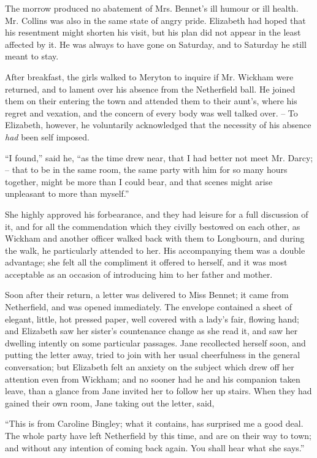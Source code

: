 The morrow produced no abatement of Mrs. Bennet’s
ill humour or ill health. Mr. Collins was also in the
same state of angry pride. Elizabeth had hoped that his
resentment might shorten his visit, but his plan did not
appear in the least affected by it. He was always to have
gone on Saturday, and to Saturday he still meant to stay.

After breakfast, the girls walked to Meryton to inquire
if Mr. Wickham were returned, and to lament over his
absence from the Netherfield ball. He joined them on
their entering the town and attended them to their aunt’s,
where his regret and vexation, and the concern of every
body was well talked over. -- To Elizabeth, however, he
voluntarily acknowledged that the necessity of his absence
\textit{had} been self imposed.

“I found,” said he, “as the time drew near, that I had
better not meet Mr. Darcy; -- that to be in the same
room, the same party with him for so many hours together,
might be more than I could bear, and that scenes might
arise unpleasant to more than myself.”

She highly approved his forbearance, and they had
leis\-ure for a full discussion of it, and for all the
commendation which they civilly bestowed on each other,
as Wickham and another officer walked back with them
to Longbourn, and during the walk, he particularly
attended to her. His accompanying them was a double
advantage; she felt all the compliment it offered to
herself, and it was most acceptable as an occasion of
introducing him to her father and mother.

Soon after their return, a letter was delivered to Miss
Bennet; it came from Netherfield, and was opened
immediately. The envelope contained a sheet of elegant,
little, hot pressed paper, well covered with a lady’s fair,
flowing hand; and Elizabeth saw her sister’s countenance
change as she read it, and saw her dwelling intently on
some particular passages. Jane recollected herself soon,
and putting the letter away, tried to join with her usual
cheerfulness in the general conversation; but Elizabeth
felt an anxiety on the subject which drew off her attention
even from Wickham; and no sooner had he and his
companion taken leave, than a glance from Jane invited
her to follow her up stairs. When they had gained their
own room, Jane taking out the letter, said,

“This is from Caroline Bingley; what it contains, has
surprised me a good deal. The whole party have left
Netherfield by this time, and are on their way to town;
and without any intention of coming back again. You
shall hear what she says.”

